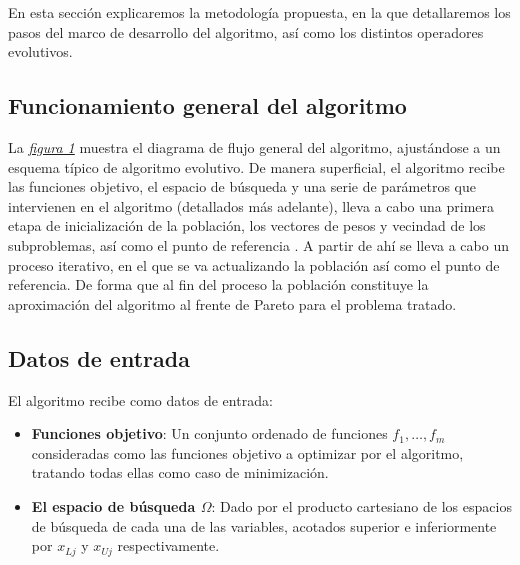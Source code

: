 \justify
\noindent\begin{minipage}[H]{0.53\textwidth}
En esta sección explicaremos la metodología propuesta, en la que detallaremos los pasos del marco de desarrollo del algoritmo, así como los distintos operadores evolutivos.\\

\subsection{Funcionamiento general del algoritmo}


La \hyperref[fig:1]{\textit{figura 1}} muestra el diagrama de flujo general del algoritmo, ajustándose a un esquema típico de algoritmo evolutivo. De manera superficial, el algoritmo recibe las funciones objetivo, el espacio de búsqueda y una serie de parámetros que intervienen en el algoritmo (detallados más adelante), lleva a cabo una primera etapa de inicialización de la población, los vectores de pesos y vecindad de los subproblemas, así como el punto de referencia . A partir de ahí se lleva a cabo un proceso iterativo, en el que se va actualizando la población así como el punto de referencia. De forma que al fin del proceso la población constituye la aproximación del algoritmo al frente de Pareto para el problema tratado.\\


\subsection{Datos de entrada}

El algoritmo recibe como datos de entrada:\\
\begin{itemize}
    \item \textbf{Funciones objetivo}: Un conjunto ordenado de funciones $f_1, \dots, f_m$  consideradas como las funciones objetivo a optimizar por el algoritmo, tratando todas ellas como caso de minimización.\\
    
     \item \textbf{El espacio de búsqueda $\Omega$}: Dado por el producto cartesiano de los espacios de búsqueda de cada una de las variables, acotados superior e inferiormente por $x_{Lj}$ y $x_{Uj}$ respectivamente.\\
     

\end{itemize}
\end{minipage}
